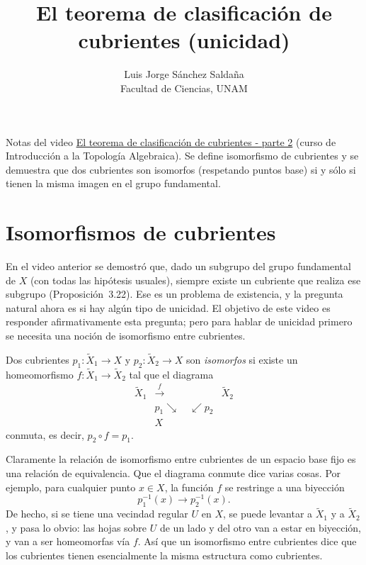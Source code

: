 \documentclass[11pt]{article}
\title{El teorema de clasificación de cubrientes (unicidad)}
\author{Luis Jorge Sánchez Saldaña\\[2pt]\small Facultad de Ciencias, UNAM}
\date{}
\begin{document}
\maketitle

\noindent\small Notas del video
\href{https://www.youtube.com/watch?v=EZlgC_DT7D0}{\guillemotleft{}El teorema de clasificación de cubrientes - parte 2\guillemotright{}}
(curso de Introducción a la Topología Algebraica). Se define isomorfismo de cubrientes y se demuestra que dos cubrientes son isomorfos (respetando puntos base) si y sólo si tienen la misma imagen en el grupo fundamental.
\normalsize

\section*{Isomorfismos de cubrientes}

En el video anterior se demostró que, dado un subgrupo del grupo fundamental de $X$ (con todas las hipótesis usuales), siempre existe un cubriente que realiza ese subgrupo (Proposición~3.22). Ese es un problema de existencia, y la pregunta natural ahora es si hay algún tipo de unicidad. El objetivo de este video es responder afirmativamente esta pregunta; pero para hablar de unicidad primero se necesita una noción de isomorfismo entre cubrientes.

\begin{defn}\label{def:iso-cubrientes}
Dos cubrientes $p_1\colon\tilde X_1\to X$ y $p_2\colon\tilde X_2\to X$ son \emph{isomorfos} si existe un homeomorfismo $f\colon\tilde X_1\to\tilde X_2$ tal que el diagrama
\[
  \begin{array}{ccc}
    \tilde X_1 & \xrightarrow{\ f\ } & \tilde X_2\\[2pt]
    & {\scriptstyle p_1}\searrow\quad\swarrow{\scriptstyle p_2} & \\[2pt]
    & X &
  \end{array}
\]
conmuta, es decir, $p_2\circ f=p_1$.
\end{defn}

Claramente la relación de isomorfismo entre cubrientes de un espacio base fijo es una relación de equivalencia. Que el diagrama conmute dice varias cosas. Por ejemplo, para cualquier punto $x\in X$, la función $f$ se restringe a una biyección
\[
  p_1^{-1}(x)\to p_2^{-1}(x).
\]
De hecho, si se tiene una vecindad regular $U$ en $X$, se puede levantar a $\tilde X_1$ y a $\tilde X_2$, y pasa lo obvio: las hojas sobre $U$ de un lado y del otro van a estar en biyección, y van a ser homeomorfas vía $f$. Así que un isomorfismo entre cubrientes dice que los cubrientes tienen esencialmente la misma estructura como cubrientes.
\end{document}
